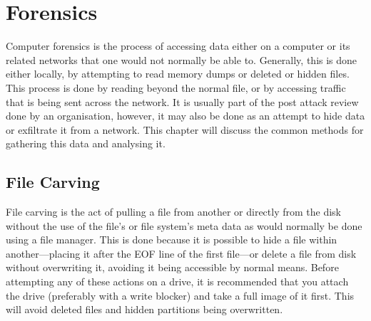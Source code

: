 \chapter{Forensics}
	\label{ch:Forensics}
	Computer forensics is the process of accessing data either on a computer or its related networks that one would not normally be able to.
	Generally, this is done either locally, by attempting to read memory dumps or deleted or hidden files.
	This process is done by reading beyond the normal file, or by accessing traffic that is being sent across the network.
	It is usually part of the post attack review done by an organisation, however, it may also be done as an attempt to hide data or exfiltrate it from a network.
	This chapter will discuss the common methods for gathering this data and analysing it.

	\section{File Carving}
		File carving is the act of pulling a file from another or directly from the disk without the use of the file's or file system's meta data as would normally be done using a file manager.
		This is done because it is possible to hide a file within another---placing it after the EOF line of the first file---or delete a file from disk without overwriting it, avoiding it being accessible by normal means.
		Before attempting any of these actions on a drive, it is recommended that you attach the drive (preferably with a write blocker) and take a full image of it first.
		This will avoid deleted files and hidden partitions being overwritten.
